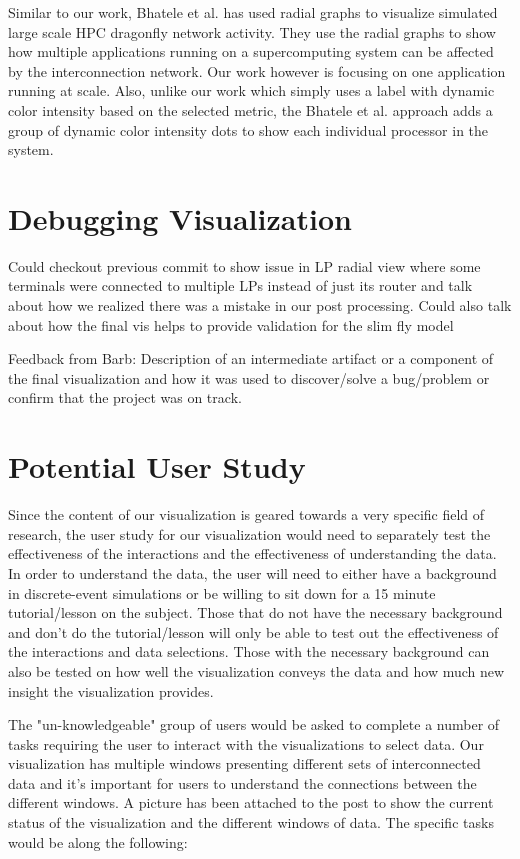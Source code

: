 \documentclass{acm_proc_article-sp}
\begin{document}
Similar to our work, Bhatele et al. \cite{DragonVis} has used radial graphs to visualize simulated large scale HPC dragonfly network activity. They use the radial graphs to show how multiple applications running on a supercomputing system can be affected by the interconnection network. Our work however is focusing on one application running at scale. Also, unlike our work which simply uses a label with dynamic color intensity based on the selected metric, the Bhatele et al. approach adds a group of dynamic color intensity dots to show each individual processor in the system. 

\section{Debugging Visualization}
\color{red} Could checkout previous commit to show issue in LP radial view where some terminals were connected to multiple LPs instead of just its router and talk about how we realized there was a mistake in our post processing.  Could also talk about how the final vis helps to provide validation for the slim fly model \color{black}



Feedback from Barb: Description of an intermediate artifact or a component of the final visualization and how it was used to discover/solve a bug/problem or confirm that the project was on track.

\section{Potential User Study}
Since the content of our visualization is geared towards a very specific field of research, the user study for our visualization would need to separately test the effectiveness of the interactions and the effectiveness of understanding the data. In order to understand the data, the user will need to either have a background in discrete-event simulations or be willing to sit down for a 15 minute tutorial/lesson on the subject. Those that do not have the necessary background and don't do the tutorial/lesson will only be able to test out the effectiveness of the interactions and data selections. Those with the necessary background can also be tested on how well the visualization conveys the data and how much new insight the visualization provides.

The "un-knowledgeable" group of users would be asked to complete a number of tasks requiring the user to interact with the visualizations to select data. Our visualization has multiple windows presenting different sets of interconnected data and it's important for users to understand the connections between the different windows. A picture has been attached to the post to show the current status of the visualization and the different windows of data. The specific tasks would be along the following:
\end{document}
